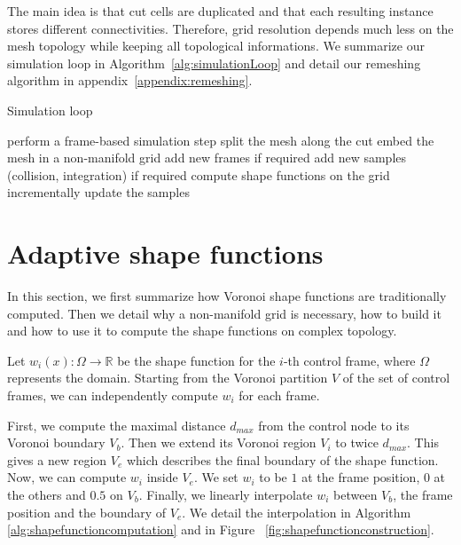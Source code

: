 The main idea is that cut cells are duplicated and that each resulting instance stores different connectivities. 
Therefore, grid resolution depends much less on the mesh topology while keeping all topological informations.
We summarize our simulation loop in Algorithm~\ref{alg:simulationLoop} and detail our remeshing algorithm in appendix~\ref{appendix:remeshing}.

\begin{algorithm}[!h]
\caption[Frame-based cutting: Simulation loop]{\label{alg:simulationLoop}Simulation loop}
\begin{algorithmic}[0]
	\State perform a frame-based simulation step
	\State split the mesh along the cut
	\State embed the mesh in a non-manifold grid
	\State add new frames if required
	\State add new samples (collision, integration) if required
	\State compute shape functions on the grid
	\State incrementally update the samples
\EndFor
\end{algorithmic}
\end{algorithm}

\newpage

\section{Adaptive shape functions} \label{sec:adaptivesf}

In this section, we first summarize how Voronoi shape functions are traditionally computed. 
Then we detail why a non-manifold grid is necessary, how to build it and how to use it to compute the shape functions on complex topology.

Let $w_{i}(x) : \Omega \rightarrow \mathbb{R}$ be the shape function for the $i$-th control frame, where $\Omega$ represents the domain. Starting from the Voronoi partition $V$ of the set of control frames, we can independently compute $w_{i}$ for each frame.

First, we compute the maximal distance $d_{max}$ from the control node to its Voronoi boundary $V_{b}$. Then we extend its Voronoi region $V_{i}$ to twice $d_{max}$. This gives a new region $V_{e}$ which describes the final boundary of the shape function. Now, we can compute $w_{i}$ inside $V_{e}$. We set $w_{i}$ to be $1$ at the frame position, $0$ at the others and $0.5$ on $V_{b}$. Finally, we linearly interpolate $w_{i}$ between $V_{b}$, the frame position and the boundary of $V_{e}$. We detail the interpolation in Algorithm~ \ref{alg:shapefunctioncomputation} and in Figure~ \ref{fig:shapefunctionconstruction}.

